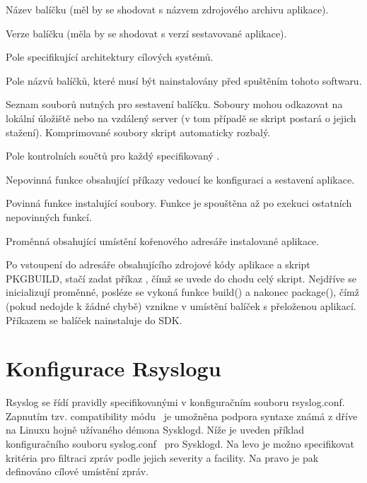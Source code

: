 \documentclass[thesis=B,czech]{FITthesis}[2012/06/26]
\begin{document}
\begin{description}
  \setlength\itemsep{-1ex}
  \item [pkgname:] Název balíčku (měl by se shodovat s názvem zdrojového archivu aplikace).
  \item [pkgver:] Verze balíčku (měla by se shodovat s verzí sestavované aplikace).
  \item [arch:] Pole specifikující architektury cílových systémů.
  \item [depends:] Pole názvů balíčků, které musí být nainstalovány před spuštěním tohoto softwaru.
  \item [source:] Seznam souborů nutných pro sestavení balíčku. Soboury mohou odkazovat na lokální úložiště nebo na vzdálený server (v tom případě se skript postará o jejich stažení). Komprimované soubory skript automaticky rozbalý.
  \item [md5sum:] Pole kontrolních součtů pro každý specifikovaný .
  \item [build():] Nepovinná funkce obsahující příkazy vedoucí ke konfiguraci a sestavení aplikace.
  \item [package():] Povinná funkce instalující soubory. Funkce je spouštěna až po exekuci ostatních nepovinných funkcí.
  \item [pkgdir:] Proměnná obsahující umístění kořenového adresáře instalované aplikace.
\end{description}

Po vstoupení do adresáře obsahujícího zdrojové kódy aplikace a skript PKGBUILD, stačí zadat příkaz , čímž se uvede do chodu celý skript. Nejdříve se inicializují proměnné, posléze se vykoná funkce build() a nakonec package(), čímž (pokud nedojde k žádné chybě) vznikne v umístění  balíček s přeloženou aplikací.
Příkazem  se balíček nainstaluje do SDK.

\section{Konfigurace Rsyslogu}
Rsyslog se řídí pravidly specifikovanými v konfiguračním souboru rsyslog.conf. Zapnutím tzv. compatibility módu~\cite{Rsyslog-comp-mode} je umožněna podpora syntaxe známá z dříve na Linuxu hojně užívaného démona Sysklogd. Níže je uveden příklad konfiguračního souboru syslog.conf~\cite{Syslog-conf} pro Sysklogd. Na levo je možno specifikovat kritéria pro filtraci zpráv podle jejich severity a facility. Na pravo je pak definováno cílové umístění zpráv.
\end{document}
